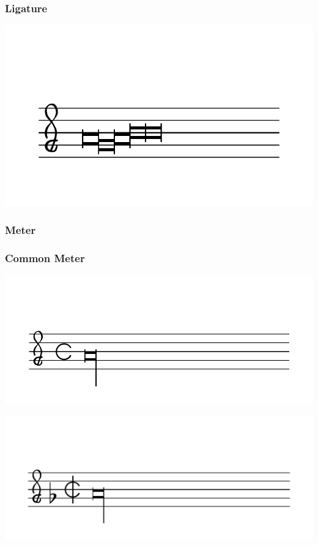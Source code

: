 \documentclass{article}
\begin{document}
    \subsubsection{Ligature}
        \includegraphics[scale=0.5]{figures_tests/pdf/smens/ligature.pdf}

    \subsubsection{Meter}
    \subsubsection*{Common Meter}
        \includegraphics[scale=0.5]{figures_tests/pdf/smens/commonmeter1.pdf}

        \includegraphics[scale=0.5]{figures_tests/pdf/smens/commonmeter2.pdf}
\end{document}
